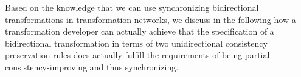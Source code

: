 Based on the knowledge that we can use synchronizing bidirectional transformations in transformation networks, we discuss in the following how a transformation developer can actually achieve that the specification of a bidirectional transformation in terms of two unidirectional consistency preservation rules does actually fulfill the requirements of being partial-consistency-improving and thus synchronizing.











